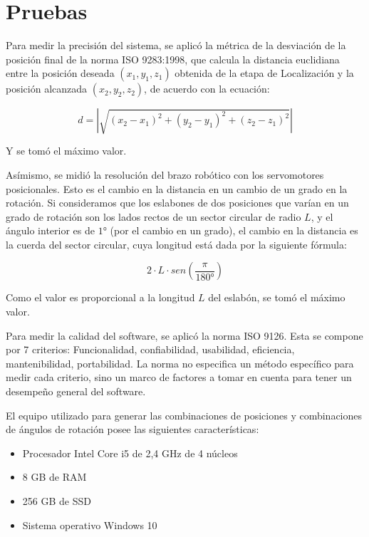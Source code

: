 \section{Pruebas}

Para medir la precisión del sistema, se aplicó la métrica de la desviación de la posición final de la norma ISO 9283:1998, que calcula la distancia euclidiana entre la posición deseada $(x_1, y_1, z_1)$ obtenida de la etapa de Localización y la posición alcanzada $(x_2, y_2, z_2)$, de acuerdo con la ecuación:

\begin{equation}
	d = |\sqrt{(x_2 - x_1)^2 + (y_2 - y_1)^2 + (z_2 - z_1)^2}|
\end{equation}

Y se tomó el máximo valor.

Asímismo, se midió la resolución del brazo robótico con los servomotores posicionales. Esto es el cambio en la distancia en un cambio de un grado en la rotación. Si consideramos que los eslabones de dos posiciones que varían en un grado de rotación son los lados rectos de un sector circular de radio $L$, y el ángulo interior es de $1°$ (por el cambio en un grado), el cambio en la distancia es la cuerda del sector circular, cuya longitud está dada por la siguiente fórmula:

\begin{equation}
	2 \cdot L \cdot sen(\frac{\pi}{180°})
\end{equation}

Como el valor es proporcional a la longitud $L$ del eslabón, se tomó el máximo valor. 

Para medir la calidad del software, se aplicó la norma ISO 9126. Esta se compone por 7 criterios: Funcionalidad, confiabilidad, usabilidad, eficiencia, mantenibilidad, portabilidad. La norma no especifica un método específico para medir cada criterio, sino un marco de factores a tomar en cuenta para tener un desempeño general del software. 

El equipo utilizado para generar las combinaciones de posiciones y combinaciones de ángulos de rotación posee las siguientes características:

\begin{itemize}
	\item Procesador Intel Core i5 de 2,4 GHz de 4 núcleos
	\item 8 GB de RAM
	\item 256 GB de SSD
	\item Sistema operativo Windows 10
\end{itemize}